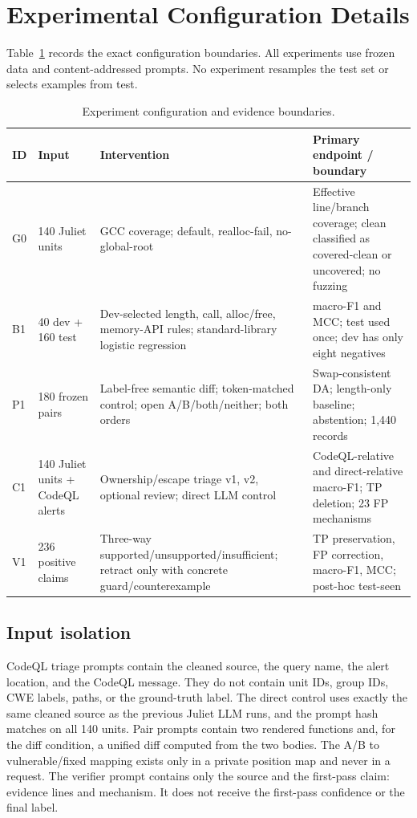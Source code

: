 \documentclass[conference]{IEEEtran}
\begin{document}
\section{Experimental Configuration Details}
\label{sec:config}

Table~\ref{tab:config} records the exact configuration boundaries. All experiments use frozen data and content-addressed prompts. No experiment resamples the test set or selects examples from test.

\begin{table}[t]
\centering
\caption{Experiment configuration and evidence boundaries.}
\label{tab:config}
\footnotesize
\setlength{\tabcolsep}{4pt}
\begin{tabular}{@{}p{1.3cm}p{2.7cm}p{4.0cm}p{4.7cm}@{}}
\toprule
ID & Input & Intervention & Primary endpoint / boundary \\
\midrule
G0 & 140 Juliet units & GCC coverage; default, realloc-fail, no-global-root & Effective line/branch coverage; clean classified as covered-clean or uncovered; no fuzzing \\
B1 & 40 dev + 160 test & Dev-selected length, call, alloc/free, memory-API rules; standard-library logistic regression & macro-F1 and MCC; test used once; dev has only eight negatives \\
P1 & 180 frozen pairs & Label-free semantic diff; token-matched control; open A/B/both/neither; both orders & Swap-consistent DA; length-only baseline; abstention; 1,440 records \\
C1 & 140 Juliet units + CodeQL alerts & Ownership/escape triage v1, v2, optional review; direct LLM control & CodeQL-relative and direct-relative macro-F1; TP deletion; 23 FP mechanisms \\
V1 & 236 positive claims & Three-way supported/unsupported/insufficient; retract only with concrete guard/counterexample & TP preservation, FP correction, macro-F1, MCC; post-hoc test-seen \\
\bottomrule
\end{tabular}
\end{table}

\subsection{Input isolation}

CodeQL triage prompts contain the cleaned source, the query name, the alert location, and the CodeQL message. They do not contain unit IDs, group IDs, CWE labels, paths, or the ground-truth label. The direct control uses exactly the same cleaned source as the previous Juliet LLM runs, and the prompt hash matches on all 140 units. Pair prompts contain two rendered functions and, for the diff condition, a unified diff computed from the two bodies. The A/B to vulnerable/fixed mapping exists only in a private position map and never in a request. The verifier prompt contains only the source and the first-pass claim: evidence lines and mechanism. It does not receive the first-pass confidence or the final label.
\end{document}
